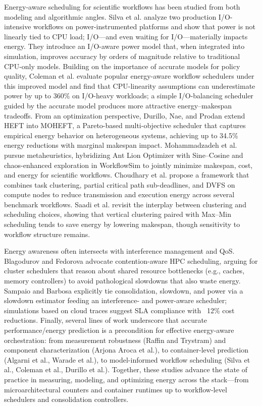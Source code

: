 Energy-aware scheduling for scientific workflows has been studied from both modeling and algorithmic angles. Silva et al. analyze two production I/O-intensive workflows on power-instrumented platforms and show that power is not linearly tied to CPU load; I/O—and even waiting for I/O—materially impacts energy. They introduce an I/O-aware power model that, when integrated into simulation, improves accuracy by orders of magnitude relative to traditional CPU-only models. Building on the importance of accurate models for policy quality, Coleman et al. evaluate popular energy-aware workflow schedulers under this improved model and find that CPU-linearity assumptions can underestimate power by up to 360\% on I/O-heavy workloads; a simple I/O-balancing scheduler guided by the accurate model produces more attractive energy–makespan tradeoffs. From an optimization perspective, Durillo, Nae, and Prodan extend HEFT into MOHEFT, a Pareto-based multi-objective scheduler that captures empirical energy behavior on heterogeneous systems, achieving up to 34.5\% energy reductions with marginal makespan impact. Mohammadzadeh et al. pursue metaheuristics, hybridizing Ant Lion Optimizer with Sine–Cosine and chaos-enhanced exploration in WorkflowSim to jointly minimize makespan, cost, and energy for scientific workflows. Choudhary et al. propose a framework that combines task clustering, partial critical path sub-deadlines, and DVFS on compute nodes to reduce transmission and execution energy across several benchmark workflows. Saadi et al. revisit the interplay between clustering and scheduling choices, showing that vertical clustering paired with Max–Min scheduling tends to save energy by lowering makespan, though sensitivity to workflow structure remains.

Energy awareness often intersects with interference management and QoS. Blagodurov and Fedorova advocate contention-aware HPC scheduling, arguing for cluster schedulers that reason about shared resource bottlenecks (e.g., caches, memory controllers) to avoid pathological slowdowns that also waste energy. Sampaio and Barbosa explicitly tie consolidation, slowdown, and power via a slowdown estimator feeding an interference- and power-aware scheduler; simulations based on cloud traces suggest SLA compliance with ~12\% cost reductions. Finally, several lines of work underscore that accurate performance/energy prediction is a precondition for effective energy-aware orchestration: from measurement robustness (Raffin and Trystram) and component characterization (Arjona Aroca et al.), to container-level prediction (Algarni et al., Warade et al.), to model-informed workflow scheduling (Silva et al., Coleman et al., Durillo et al.). Together, these studies advance the state of practice in measuring, modeling, and optimizing energy across the stack—from microarchitectural counters and container runtimes up to workflow-level schedulers and consolidation controllers.